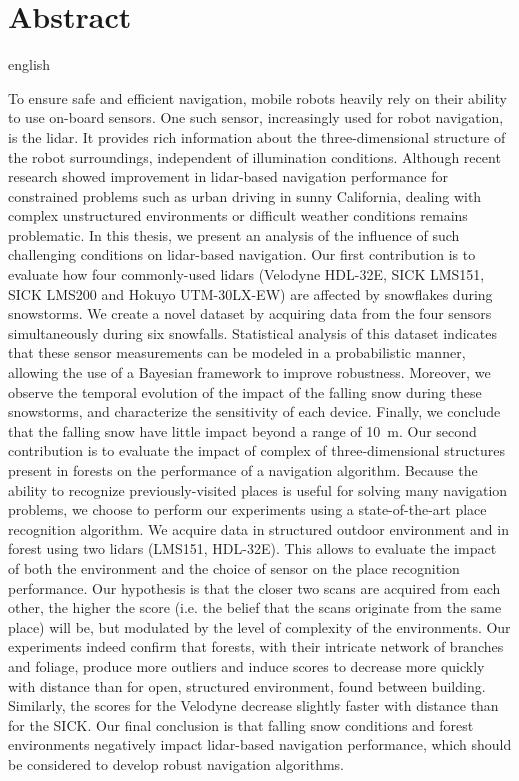 \chapter*{Abstract}  

\begin{otherlanguage*}{english}

    To ensure safe and efficient navigation, mobile robots heavily rely on their ability to use on-board sensors. One such sensor, increasingly used for robot navigation, is the \gls*{lidar}. It provides rich information about the three-dimensional structure of the robot surroundings, independent of illumination conditions. Although recent research showed improvement in \gls*{lidar}-based navigation performance for constrained problems such as urban driving in sunny California, dealing with complex unstructured environments or difficult weather conditions remains problematic. In this thesis, we present an analysis of the influence of such challenging conditions on \gls*{lidar}-based navigation. Our first contribution is to evaluate how four commonly-used \gls*{lidar}s (Velodyne HDL-32E, SICK LMS151, SICK LMS200 and Hokuyo UTM-30LX-EW) are affected by snowflakes during snowstorms. We create a novel dataset by acquiring data from the four sensors simultaneously during six snowfalls. Statistical analysis of this dataset indicates that these sensor measurements can be modeled in a probabilistic manner, allowing the use of a Bayesian framework to improve robustness. Moreover, we observe the temporal evolution of the impact of the falling snow during these snowstorms, and characterize the sensitivity of each device. Finally, we conclude that the falling snow have little impact beyond a range of \SI{10}{\meter}. Our second contribution is to evaluate the impact of complex of three-dimensional structures present in forests on the performance of a navigation algorithm. Because the ability to recognize previously-visited places is useful for solving many navigation problems, we choose to perform our experiments using a state-of-the-art place recognition algorithm. We acquire data in structured outdoor environment and in forest using two \gls*{lidar}s (LMS151, HDL-32E). This allows to evaluate the impact of both the environment and the choice of sensor on the place recognition performance. Our hypothesis is that the closer two scans are acquired from each other, the higher the score (i.e. the belief that the scans originate from the same place) will be, but modulated by the level of complexity of the environments. Our experiments indeed confirm that forests, with their intricate network of branches and foliage, produce more outliers and induce scores to decrease more quickly with distance than for open, structured environment, found between building. Similarly, the scores for the Velodyne decrease slightly faster with distance than for the SICK. Our final conclusion is that falling snow conditions and forest environments negatively impact \gls*{lidar}-based navigation performance, which should be considered to develop robust navigation algorithms.

\end{otherlanguage*} 

